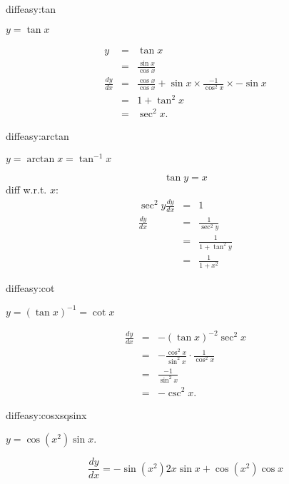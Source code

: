 \begin{defproblem}{diffeasy:tan}%
\begin{onlyproblem}%
\(y = \tan x\)%
\end{onlyproblem}
\begin{onlysolution}%
\begin{eqnarray*}
y & = & \tan x\\
 & = & \frac{\sin x}{\cos x}\\
\frac{dy}{dx} & = & \frac{\cos x}{\cos x} + \sin x\times\frac{-1}{\cos^2x}\times -\sin x\\
 & = & 1 + \tan^2x\\
 & = & \sec^2x.
\end{eqnarray*}
\end{onlysolution}%
\end{defproblem}

\begin{defproblem}{diffeasy:arctan}%
\begin{onlyproblem}%
\(y = \arctan x = \tan^{-1}x\)%
\end{onlyproblem}%
\begin{onlysolution}%
\[\tan y = x\]
diff w.r.t. $x$:
\begin{eqnarray*}
\sec^2y\frac{dy}{dx} & = & 1\\
\frac{dy}{dx} & = & \frac{1}{\sec^2y}\\
 & = & \frac{1}{1+\tan^2y}\\
 & = & \frac{1}{1+x^2}
\end{eqnarray*}
\end{onlysolution}%
\end{defproblem}

\begin{defproblem}{diffeasy:cot}%
\begin{onlyproblem}%
\(y = (\tan x)^{-1} = \cot x\)%
\end{onlyproblem}
\begin{onlysolution}%
\begin{eqnarray*}
\frac{dy}{dx} & = & -(\tan x)^{-2}\sec^2x\\
 & = & -\frac{\cos^2x}{\sin^2x}\cdot\frac{1}{\cos^2x}\\
 & = & \frac{-1}{\sin^2x}\\
 & = & -\csc^2x.
\end{eqnarray*}
\end{onlysolution}%
\end{defproblem}

\begin{defproblem}{diffeasy:cosxsqsinx}%
\begin{onlyproblem}%
$y = \cos(x^2)\sin x$.%
\end{onlyproblem}%
\begin{onlysolution}%
\[\frac{dy}{dx} = -\sin(x^2)2x\sin x + \cos(x^2)\cos x\]
\end{onlysolution}%
\end{defproblem}

